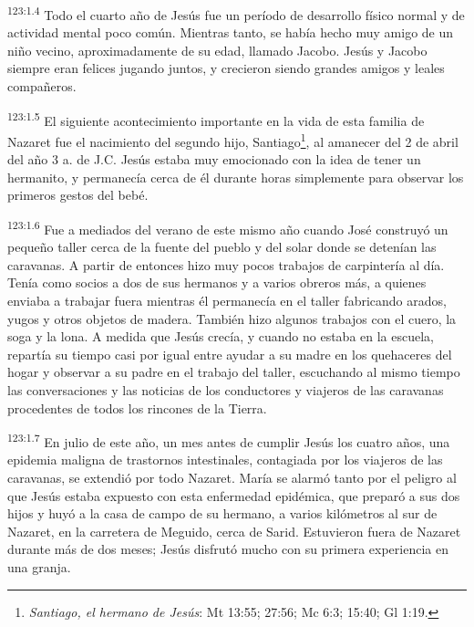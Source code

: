 \par 
\textsuperscript{123:1.4} Todo el cuarto año de Jesús fue un período de desarrollo físico normal y de actividad mental poco común. Mientras tanto, se había hecho muy amigo de un niño vecino, aproximadamente de su edad, llamado Jacobo. Jesús y Jacobo siempre eran felices jugando juntos, y crecieron siendo grandes amigos y leales compañeros.

\par 
\textsuperscript{123:1.5} El siguiente acontecimiento importante en la vida de esta familia de Nazaret fue el nacimiento del segundo hijo, Santiago\footnote{\textit{Santiago, el hermano de Jesús}: Mt 13:55; 27:56; Mc 6:3; 15:40; Gl 1:19.}, al amanecer del 2 de abril del año 3 a. de J.C. Jesús estaba muy emocionado con la idea de tener un hermanito, y permanecía cerca de él durante horas simplemente para observar los primeros gestos del bebé.

\par 
\textsuperscript{123:1.6} Fue a mediados del verano de este mismo año cuando José construyó un pequeño taller cerca de la fuente del pueblo y del solar donde se detenían las caravanas. A partir de entonces hizo muy pocos trabajos de carpintería al día. Tenía como socios a dos de sus hermanos y a varios obreros más, a quienes enviaba a trabajar fuera mientras él permanecía en el taller fabricando arados, yugos y otros objetos de madera. También hizo algunos trabajos con el cuero, la soga y la lona. A medida que Jesús crecía, y cuando no estaba en la escuela, repartía su tiempo casi por igual entre ayudar a su madre en los quehaceres del hogar y observar a su padre en el trabajo del taller, escuchando al mismo tiempo las conversaciones y las noticias de los conductores y viajeros de las caravanas procedentes de todos los rincones de la Tierra.

\par 
\textsuperscript{123:1.7} En julio de este año, un mes antes de cumplir Jesús los cuatro años, una epidemia maligna de trastornos intestinales, contagiada por los viajeros de las caravanas, se extendió por todo Nazaret. María se alarmó tanto por el peligro al que Jesús estaba expuesto con esta enfermedad epidémica, que preparó a sus dos hijos y huyó a la casa de campo de su hermano, a varios kilómetros al sur de Nazaret, en la carretera de Meguido, cerca de Sarid. Estuvieron fuera de Nazaret durante más de dos meses; Jesús disfrutó mucho con su primera experiencia en una granja.

